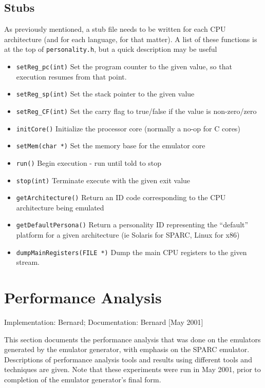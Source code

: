 \subsection{Stubs}

As previously mentioned, a stub file needs to be written for each CPU 
architecture (and for each language, for that matter). A list of these 
functions is at the top of \texttt{personality.h}, but a quick description 
may be useful

\begin{itemize}
  \item{\texttt{setReg\_pc(int)}} Set the program counter to the given value, 
	so that execution resumes from that point.
  \item{\texttt{setReg\_sp(int)}} Set the stack pointer to the given value
  \item{\texttt{setReg\_CF(int)}} Set the carry flag to true/false if the 
	value is non-zero/zero
  \item{\texttt{initCore()}}     Initialize the processor core (normally a 
	no-op for C cores)
  \item{\texttt{setMem(char *)}} Set the memory base for the emulator core
  \item{\texttt{run()}}          Begin execution - run until told to stop
  \item{\texttt{stop(int)}}      Terminate execute with the given exit value
  \item{\texttt{getArchitecture()}} Return an ID code corresponding to the 
	CPU architecture being emulated
  \item{\texttt{getDefaultPersona()}} Return a personality ID representing 
	the ``default'' platform for a given architecture (ie Solaris for SPARC, 
	Linux for x86)
  \item{\texttt{dumpMainRegisters(FILE *)}} Dump the main CPU registers to the 
	given stream.
\end{itemize}


\section{Performance Analysis}
{\small
\begin{flushright}
Implementation: Bernard; Documentation: Bernard [May 2001]
\end{flushright}
}

This section documents the performance analysis that was done on the 
emulators generated by the emulator generator, with emphasis on the
SPARC emulator.  Descriptions of performance analysis tools and 
results using different tools and techniques are given.  
Note that these experiments were run in May 2001, prior to completion 
of the emulator generator's final form. 


